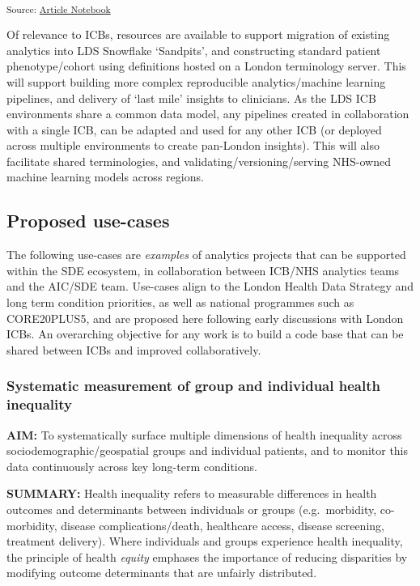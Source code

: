 \documentclass[
  letterpaper,
  DIV=11,
  numbers=noendperiod]{scrartcl}
\begin{document}
\textsubscript{Source:
\href{https://d3london.github.io/sde_aic_docs/index.qmd.html}{Article
Notebook}}

Of relevance to ICBs, resources are available to support migration of
existing analytics into LDS Snowflake `Sandpits', and constructing
standard patient phenotype/cohort using definitions hosted on a London
terminology server. This will support building more complex reproducible
analytics/machine learning pipelines, and delivery of `last mile'
insights to clinicians. As the LDS ICB environments share a common data
model, any pipelines created in collaboration with a single ICB, can be
adapted and used for any other ICB (or deployed across multiple
environments to create pan-London insights). This will also facilitate
shared terminologies, and validating/versioning/serving NHS-owned
machine learning models across regions.

\subsection{Proposed use-cases}\label{proposed-use-cases}

The following use-cases are \emph{examples} of analytics projects that
can be supported within the SDE ecosystem, in collaboration between
ICB/NHS analytics teams and the AIC/SDE team. Use-cases align to the
London Health Data Strategy and long term condition priorities, as well
as national programmes such as CORE20PLUS5, and are proposed here
following early discussions with London ICBs. An overarching objective
for any work is to build a code base that can be shared between ICBs and
improved collaboratively.

\subsubsection{Systematic measurement of group and individual health
inequality}\label{systematic-measurement-of-group-and-individual-health-inequality}

\textbf{AIM:} To systematically surface multiple dimensions of health
inequality across sociodemographic/geospatial groups and individual
patients, and to monitor this data continuously across key long-term
conditions.

\textbf{SUMMARY:} Health inequality refers to measurable differences in
health outcomes and determinants between individuals or groups
(e.g.~morbidity, co-morbidity, disease complications/death, healthcare
access, disease screening, treatment delivery). Where individuals and
groups experience health inequality, the principle of health
\emph{equity} emphases the importance of reducing disparities by
modifying outcome determinants that are unfairly distributed.
\end{document}
